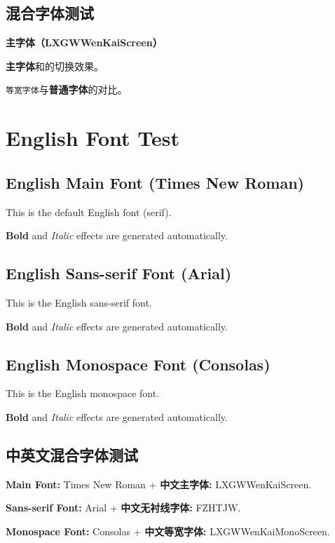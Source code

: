 \documentclass[fontset=none]{ctexart}
\begin{document}
\subsection{混合字体测试}
{
\textbf{主字体（LXGWWenKaiScreen）}
\par
{}
\par
{}
\par
\textbf{主字体}和的切换效果。  
\par
\texttt{等宽字体}与\textbf{普通字体}的对比。 
}

\section{English Font Test}

\subsection{English Main Font (Times New Roman)}
This is the default English font (serif).  
\par
\textbf{Bold} and \textit{Italic} effects are generated automatically.  

\subsection{English Sans-serif Font (Arial)}
{\sffamily
This is the English sans-serif font.  
\par
\textbf{Bold} and \textit{Italic} effects are generated automatically.  
}

\subsection{English Monospace Font (Consolas)}
{\ttfamily
This is the English monospace font.  
\par
\textbf{Bold} and \textit{Italic} effects are generated automatically.  
}

\subsection{中英文混合字体测试}
\textbf{Main Font:} Times New Roman + \textbf{中文主字体:} LXGWWenKaiScreen.  
\par
{\sffamily \textbf{Sans-serif Font:} Arial + \textbf{中文无衬线字体:} FZHTJW.}  
\par
{\ttfamily \textbf{Monospace Font:} Consolas + \textbf{中文等宽字体:} LXGWWenKaiMonoScreen.}
\end{document}
